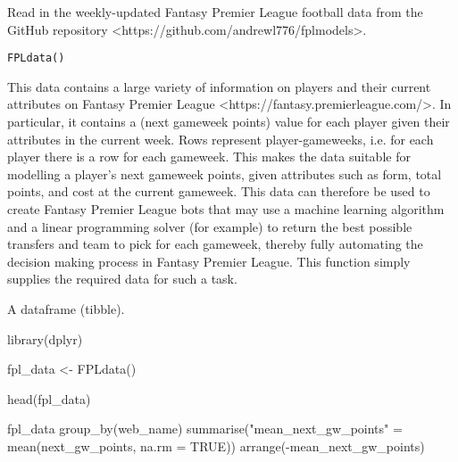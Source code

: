 \documentclass[a4paper]{book}
\begin{document}
%
\begin{Description}\relax
Read in the weekly-updated Fantasy Premier League football data from the
GitHub repository <https://github.com/andrewl776/fplmodels>.
\end{Description}
%
\begin{Usage}
\begin{verbatim}
FPLdata()
\end{verbatim}
\end{Usage}
%
\begin{Details}\relax
This data contains a large variety of information on players and their
current attributes on Fantasy Premier League
<https://fantasy.premierleague.com/>. In particular, it contains a
 (next gameweek points) value for each player
given their attributes in the current week. Rows represent player-gameweeks,
i.e. for each player there is a row for each gameweek. This
makes the data suitable for modelling a player's next gameweek points, given
attributes such as form, total points, and cost at the current gameweek.
This data can therefore be used to create Fantasy Premier League bots that
may use a machine learning algorithm and a linear programming solver
(for example) to return the best possible transfers and team to pick for
each gameweek, thereby fully automating the decision making process in
Fantasy Premier League. This function simply supplies the required data
for such a task.
\end{Details}
%
\begin{Value}
A dataframe (tibble).
\end{Value}
%
\begin{Examples}
\begin{ExampleCode}
{

library(dplyr)

fpl_data <- FPLdata()

head(fpl_data)

fpl_data %
  group_by(web_name) %
  summarise("mean_next_gw_points" = mean(next_gw_points, na.rm = TRUE)) %
  arrange(-mean_next_gw_points)

}
\end{ExampleCode}
\end{Examples}
\printindex{}
\end{document}
